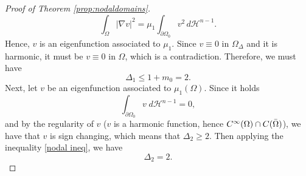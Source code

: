 \documentclass[12pt,reqno]{amsart}
\numberwithin{equation}{section}
\numberwithin{theorem}{section}
\numberwithin{equation}{section}
\numberwithin{theorem}{section}
\begin{document}
\begin{proof} [Proof of Theorem \ref{prop:nodaldomains}]
\begin{equation*}
        \int_{\Omega}|\nabla v|^2 = \mu_1\int_{\partial \Omega_0}v^2\,d\mathcal{H}^{n-1}.
    \end{equation*}
    Hence, $v$ is an eigenfunction associated to $\mu_1$. Since $v\equiv 0$ in $\Omega_\Delta$ and it is harmonic, it must be $v\equiv 0$ in $\Omega$, which is a contradiction. Therefore, we must have
     \begin{equation} \label{nodal ineq}
        \Delta_{1}\le 1+ m_0=2.
    \end{equation}
Next, let $v$ be an eigenfunction associated to $\mu_1 (\Omega)$. Since it holds 
    $$ \int_{\partial \Omega_0}v \;d\mathcal{H}^{n-1}=0,$$
    and by the regularity of $v$ ($v$ is a harmonic function, hence $C^\infty(\Omega)\cap C(\Bar{\Omega})$), we have that 
     $v$ is sign changing, which means that $\Delta_2 \ge 2$. Then applying the inequality \eqref{nodal ineq}, we have \begin{equation*} \Delta_2 = 2.
    \end{equation*}
\end{proof}


\end{document}
